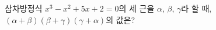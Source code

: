 삼차방정식 $x^3-x^2+5x+2=0$의 세 근을 $\alpha$, $\beta$, $\gamma$라 할 때, $(\alpha+\beta)(\beta+\gamma)(\gamma+\alpha)$의 값은?
